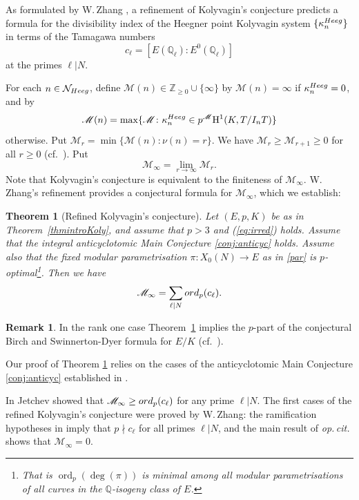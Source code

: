 \documentclass[10pt,reqno]{amsart}
\numberwithin{equation}{section}
\theoremstyle{plain}
\theoremstyle{definition}
\newtheorem*{rmk-intro}{Remark}
\theoremstyle{definition}
\theoremstyle{plain}
\theoremstyle{plain}
\theoremstyle{plain}
\theoremstyle{plain}
\theoremstyle{plain}
\newtheorem{thmintro}{Theorem}
\theoremstyle{plain}
\DeclareMathOperator{\ord}{ord}
\newcommand{\Z}{\mathbb{Z}}
\newcommand{\Q}{\mathbb{Q}}
\newcommand{\rH}{\mathrm{H}}
\begin{document}
As formulated by W.\,Zhang \cite{zhang_ind}, 
a refinement of Kolyvagin's conjecture predicts a formula for the divisibility index of the Heegner point Kolyvagin system $\{\kappa_n^{\rm Heeg}\}$ in terms of the Tamagawa numbers $$c_\ell=[E(\Q_\ell):E^{0}(\Q_\ell)]$$ at the primes $\ell\vert N$. 

For each $n\in\mathcal{N}_{\rm Heeg}$, define $\mathscr{M}(n)\in\Z_{\geq 0}\cup\{\infty\}$ by $\mathscr{M}(n)=\infty$ if $\kappa_n^{\rm Heeg}=0$, and by
\[
\mathscr{M}(n)=\max\{\mathscr{M}\colon\kappa_n^{\rm Heeg}\in p^{\mathscr{M}}\rH^1(K,T/I_nT)\}
\]
otherwise. Put $\mathscr{M}_{r}=\min\{\mathscr{M}(n)\colon\nu(n)=r\}$. 
We have $\mathscr{M}_{r}\geq\mathscr{M}_{r+1}\geq 0$ for all $r\geq 0$ (cf.~\cite{kolystructure}).
 Put 
\[
\mathscr{M}_{\infty}=\lim_{r\to\infty}\mathscr{M}_{r}.
\]
Note that Kolyvagin's conjecture is equivalent to the finiteness of $\mathscr{M}_{\infty}$. 
W. Zhang's refinement \cite[Conj.~4.5]{zhang_ind} provides a conjectural formula for $\mathscr{M}_{\infty}$, 
which we establish:
\begin{thmintro}[Refined Kolyvagin's conjecture]\label{thmintroKoly-div}
Let $(E,p,K)$ be as in Theorem~\ref{thmintroKoly}, and assume that $p>3$ and {\rm (\ref{eq:irred})} holds. Assume that the integral anticyclotomic Main Conjecture \ref{conj:anticyc} holds.
Assume also that the fixed modular parametrisation $\pi: X_{0}(N) \to E$ as in 
\eqref{par} is $p$-optimal\footnote{That is 
$\ord_p(\deg(\pi))$ is minimal among all modular parametrisations of all curves in the $\Q$-isogeny class of $E$. }. 
Then we have
\[
\mathscr{M}_{\infty}=\sum_{\ell\mid N}{\rm ord}_p(c_\ell).
\]
\end{thmintro}
\begin{rmk-intro}
In the rank one case Theorem~\ref{thmintroKoly-div} implies the $p$-part of the conjectural Birch and Swinnerton-Dyer formula for $E/K$ (cf.~\cite[Theorem~1.6]{zhang_ind}).
\end{rmk-intro}


Our proof  of Theorem \ref{thmintroKoly-div} 
relies on the cases of 
the anticyclotomic Main 
Conjecture \ref{conj:anticyc} established in \cite{bcs}. 


In \cite{jetchev} Jetchev 
showed that $\mathscr{M}_{\infty}\geq {\rm ord}_p(c_\ell)$ for any prime $\ell\vert N$. The first cases of the refined Kolyvagin's conjecture were proved by W.\,Zhang: the ramification hypotheses in \cite{zhang_ind} imply that $p\nmid c_\ell$ for all primes $\ell\vert N$, and the main result of \emph{op.\,cit.} shows that $\mathscr{M}_{\infty}=0$.
\end{document}
